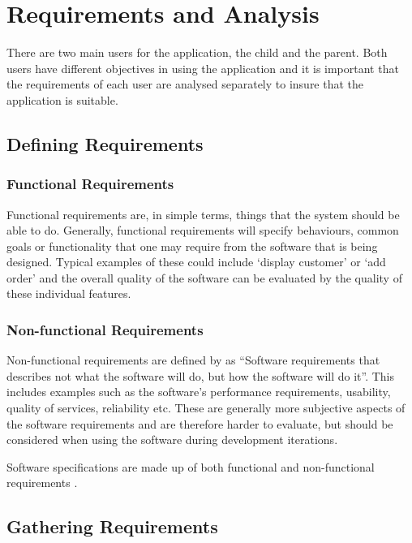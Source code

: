 \chapter{Requirements and Analysis}
\label{chap:methodology}

There are two main users for the application, the child and the parent. 
Both users have different objectives in using the application and it is important that the requirements of each user are analysed separately to insure that the application is suitable.

\section{Defining Requirements}
\subsection{Functional Requirements}
Functional requirements are, in simple terms, things that the system should be able to do. 
Generally, functional requirements will specify behaviours, common goals or functionality that one may require from the software that is being designed.
Typical examples of these could include `display customer' or `add order' and the overall quality of the software can be evaluated by the quality of these individual features.

\subsection{Non-functional Requirements}
Non-functional requirements are defined by \cite[p.6]{chung2012non} as ``Software requirements that describes not what the software will do, but how the software will do it''.
This includes examples such as the software's performance requirements, usability, quality of services, reliability etc.
These are generally more subjective aspects of the software requirements and are therefore harder to evaluate, but should be considered when using the software during development iterations.

Software specifications are made up of both functional and non-functional requirements \cite[p.143]{chung2012non}. 

\section{Gathering Requirements}
